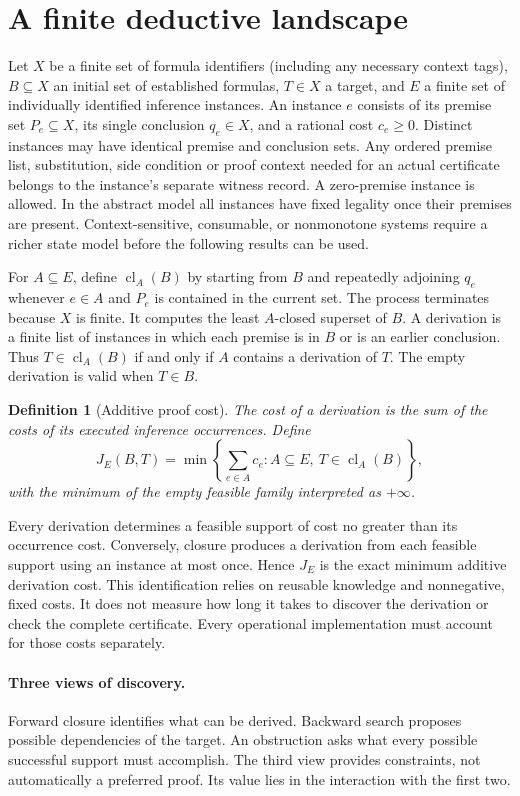 \documentclass[11pt]{article}
\newtheorem{definition}[theorem]{Definition}
\theoremstyle{remark}\newtheorem{remark}[theorem]{Remark}
\newcommand{\cl}{\operatorname{cl}}
\begin{document}
\section{A finite deductive landscape}
Let $X$ be a finite set of formula identifiers (including any necessary context tags), $B\subseteq X$ an initial set of established formulas, $T\in X$ a target, and $E$ a finite set of individually identified inference instances. An instance $e$ consists of its premise set $P_e\subseteq X$, its single conclusion $q_e\in X$, and a rational cost $c_e\geq0$. Distinct instances may have identical premise and conclusion sets. Any ordered premise list, substitution, side condition or proof context needed for an actual certificate belongs to the instance's separate witness record. A zero-premise instance is allowed. In the abstract model all instances have fixed legality once their premises are present. Context-sensitive, consumable, or nonmonotone systems require a richer state model before the following results can be used.

For $A\subseteq E$, define $\cl_A(B)$ by starting from $B$ and repeatedly adjoining $q_e$ whenever $e\in A$ and $P_e$ is contained in the current set. The process terminates because $X$ is finite. It computes the least $A$-closed superset of $B$. A derivation is a finite list of instances in which each premise is in $B$ or is an earlier conclusion. Thus $T\in\cl_A(B)$ if and only if $A$ contains a derivation of $T$. The empty derivation is valid when $T\in B$.

\begin{definition}[Additive proof cost]
The cost of a derivation is the sum of the costs of its executed inference occurrences. Define
\[
J_E(B,T)=\min\left\{\sum_{e\in A}c_e:A\subseteq E,\ T\in\cl_A(B)\right\},
\]
with the minimum of the empty feasible family interpreted as $+\infty$.
\end{definition}
Every derivation determines a feasible support of cost no greater than its occurrence cost. Conversely, closure produces a derivation from each feasible support using an instance at most once. Hence $J_E$ is the exact minimum additive derivation cost. This identification relies on reusable knowledge and nonnegative, fixed costs. It does not measure how long it takes to discover the derivation or check the complete certificate. Every operational implementation must account for those costs separately.

\paragraph{Three views of discovery.} Forward closure identifies what can be derived. Backward search proposes possible dependencies of the target. An obstruction asks what every possible successful support must accomplish. The third view provides constraints, not automatically a preferred proof. Its value lies in the interaction with the first two.
\end{document}
